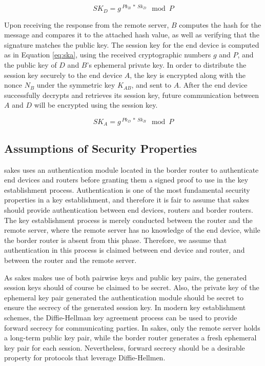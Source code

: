 \begin{equation}
\label{eq:skd}
SK_D = g^{\ Pk_{B}\ *\ Sk_D} \mod P
\end{equation}

Upon receiving the response from the remote server, $B$ computes the hash for the message and compares it to the attached hash value, as well as verifying that the signature matches the public key. The session key for the end device is computed as in Equation \ref{eq:ska}, using the received cryptographic numbers $g$ and $P$, and the public key of $D$ and $B$'s ephemeral private key. In order to distribute the session key securely to the end device $A$, the key is encrypted along with the nonce $N_B$ under the symmetric key $K_{AB}$, and sent to $A$. After the end device successfully decrypts and retrieves its session key, future communication between $A$ and $D$ will be encrypted using the session key. 

\begin{equation}
\label{eq:ska}
SK_A = g^{\ Pk_{D}\ *\ Sk_B} \mod P
\end{equation}


\subsection{Assumptions of Security Properties}

\gls{sakes} uses an authentication module located in the border router to authenticate end devices and routers before granting them a signed proof to use in the key establishment process. Authentication is one of the most fundamental security properties in a key establishment, and therefore it is fair to assume that \gls{sakes} should provide authentication between end devices, routers and border routers. The key establishment process is merely conducted between the router and the remote server, where the remote server has no knowledge of the end device, while the border router is absent from this phase. Therefore, we assume that authentication in this process is claimed between end device and router, and between the router and the remote server.

As \gls{sakes} makes use of both pairwise keys and public key pairs, the generated session keys should of course be claimed to be secret. Also, the private key of the ephemeral key pair generated the authentication module should be secret to ensure the secrecy of the generated session key. In modern key establishment schemes, the Diffie-Hellman key agreement process can be used to provide forward secrecy for communicating parties. In \gls{sakes}, only the remote server holds a long-term public key pair, while the border router generates a fresh ephemeral key pair for each session. Nevertheless, forward secrecy should be a desirable property for protocols that leverage Diffie-Hellmen. 


